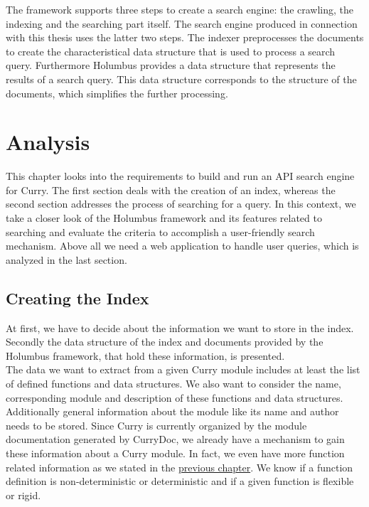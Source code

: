 \documentclass[%
	pdftex,%
	a4paper,%
	oneside,%
	chapterprefix,%
	headsepline,%
	12pt%
]{scrbook}
\begin{document}
The framework supports three steps to create a search engine: the
crawling, the indexing and the searching part itself. The search
engine produced in connection with this thesis uses the latter two steps. The
indexer preprocesses the documents to create the characteristical data
structure that is used to process a search query. Furthermore Holumbus
provides a data structure that represents the results of a search
query. This data structure corresponds to the structure of the
documents, which simplifies the further processing.\\

\chapter{Analysis}\label{analysis}
This chapter looks into the requirements to build and run an API search
engine for Curry. The first section deals with the creation of an
index, whereas the second section addresses the process of searching
for a query. In this context, we take a closer look of the Holumbus
framework and its features related to searching and evaluate the criteria
to accomplish a user-friendly search mechanism. Above all we need a web
application to handle user queries, which is analyzed in the last
section.




\section{Creating the Index}
At first, we have to decide about the information we want to store in
the index. Secondly the data structure of the index and documents
provided by the Holumbus framework, that hold
these information, is presented.\\

The data we want to extract from a given Curry module includes at least
the list of defined functions and data structures. We also want to
consider the name, corresponding module and description of these
functions and data structures. Additionally general information about
the module like its name and author needs to be stored. Since Curry is
currently organized by the module documentation generated by CurryDoc,
we already have a mechanism to gain these information about a Curry
module. In fact, we even have more function related information as we
stated in the \hyperref[preliminaries:curryInfo]{previous chapter}. We
know if a function definition is non-deterministic or deterministic
and if a given function is flexible or rigid.
\end{document}
